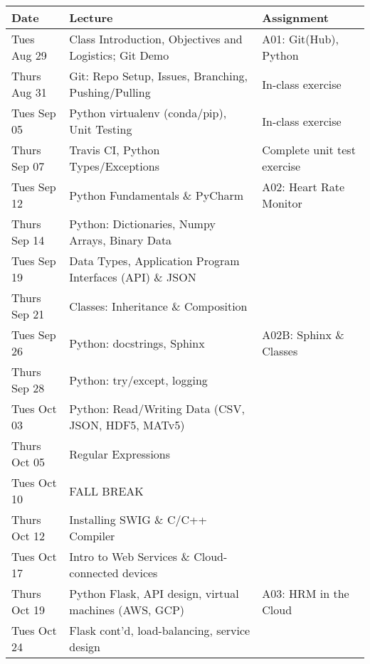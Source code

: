\begin{longtable}[c]{|l|l|l|}

    \hline
    
    \textbf{Date} & \textbf{Lecture} & \textbf{Assignment}\\

    \hline

    Tues Aug 29     & 
        Class Introduction, Objectives and Logistics; Git Demo & 
        A01: Git(Hub), Python\\
    Thurs Aug 31    & 
        Git: Repo Setup, Issues, Branching, Pushing/Pulling & 
        In-class exercise\\
    \hline
    Tues Sep 05     & 
        Python virtualenv (conda/pip), Unit Testing & 
        In-class exercise\\
    Thurs Sep 07    & 
        Travis CI, Python Types/Exceptions & 
        Complete unit test exercise\\
    \hline
    Tues Sep 12     & 
        Python Fundamentals \& PyCharm & 
        A02: Heart Rate Monitor \\
    Thurs Sep 14    & 
        Python: Dictionaries, Numpy Arrays, Binary Data & \\
    \hline
    Tues Sep 19     & 
        Data Types, Application Program Interfaces (API) \& JSON & \\
    Thurs Sep 21    & 
        Classes: Inheritance \& Composition & \\
    \hline
    Tues Sep 26     & 
        Python: docstrings, Sphinx & A02B: Sphinx \& Classes\\
    Thurs Sep 28    & 
        Python: try/except, logging & \\
    \hline
    Tues Oct 03     & 
        Python: Read/Writing Data (CSV, JSON, HDF5, MATv5) & \\
    Thurs Oct 05    & 
        Regular Expressions & \\
    \hline
    Tues Oct 10     & 
        FALL BREAK & \\
    Thurs Oct 12    & 
        Installing SWIG \& C/C++ Compiler & \\
    \hline
    Tues Oct 17     & 
        Intro to Web Services \& Cloud-connected devices& \\
    Thurs Oct 19    & 
        Python Flask, API design, virtual machines (AWS, GCP) &
        A03: HRM in the Cloud\\
    \hline
    Tues Oct 24     & 
        Flask cont'd, load-balancing, service design & \\

\end{longtable}
